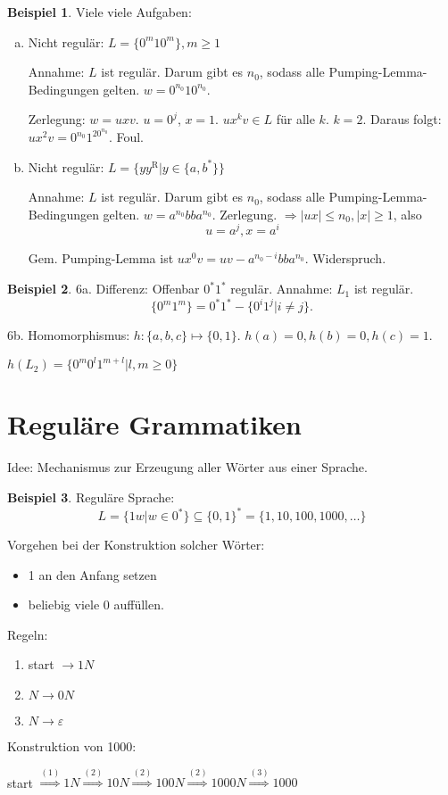 \documentclass[11pt]{article} %
\theoremstyle{definition}
\newtheorem*{beispiel}{Beispiel}
\begin{document}
\begin{beispiel} Viele viele Aufgaben:
\begin{enumerate}[(a)]
\item Nicht regulär: $L = \{0^m10^m\}, m \ge 1$

Annahme: $L$ ist regulär. Darum gibt es $n_0$, sodass alle Pumping-Lemma-Bedingungen gelten. $w = 0^{n_0}10^{n_0}$.

Zerlegung: $w = uxv$. $u = 0^j$, $x = 1$. $ux^kv \in L$ für alle $k$. $k = 2$. Daraus folgt: $ux^2v = 0^{n_0}1^20^{n_0}$. Foul.

\item Nicht regulär: $L = \{yy^\textrm{R} | y \in \{a,b^*\} \}$

Annahme: $L$ ist regulär. Darum gibt es $n_0$, sodass alle Pumping-Lemma-Bedingungen gelten. $w = a^{n_0}bba^{n_0}$. Zerlegung. $\Rightarrow |ux| \le n_0, |x| \ge 1$, also
\[
u = a^j, x = a^i
\]

Gem. Pumping-Lemma ist $ux^0v = uv-a^{n_0-i}bba^{n_0}$. Widerspruch.

\end{enumerate}
\end{beispiel}

\begin{beispiel}
6a. Differenz: Offenbar $0^*1^*$ regulär. Annahme: $L_1$ ist regulär.
\[
\{0^m1^m\} = 0^*1^* - \{0^i1^j | i \neq j \}. 
\]

6b. Homomorphismus: $h: \{ a,b,c\} \mapsto \{0,1\}$. $h(a) = 0, h(b) = 0, h(c) = 1$.

$h(L_2) = \{0^m0^l1^{m+l} | l, m \ge 0\}$
\end{beispiel}

\section{Reguläre Grammatiken}

Idee: Mechanismus zur Erzeugung aller Wörter aus einer Sprache.

\begin{beispiel} Reguläre Sprache:
\[
L = \{1w | w \in 0^* \} \subseteq \{0,1\}^* = \{1, 10, 100, 1000, \dots \}
\]

Vorgehen bei der Konstruktion solcher Wörter:
\begin{itemize}
\item 1 an den Anfang setzen
\item beliebig viele 0 auffüllen.
\end{itemize}

Regeln:
\begin{enumerate}[(1)]
\item start $\rightarrow 1N$
\item $N \rightarrow 0N$
\item $N \rightarrow \varepsilon$
\end{enumerate}

Konstruktion von 1000:

start $\overset{(1)}{\Rightarrow} 1N \overset{(2)}{\Rightarrow} 10N \overset{(2)}{\Rightarrow} 100N \overset{(2)}{\Rightarrow} 1000N \overset{(3)}{\Rightarrow} 1000$

\end{beispiel}
\end{document}
